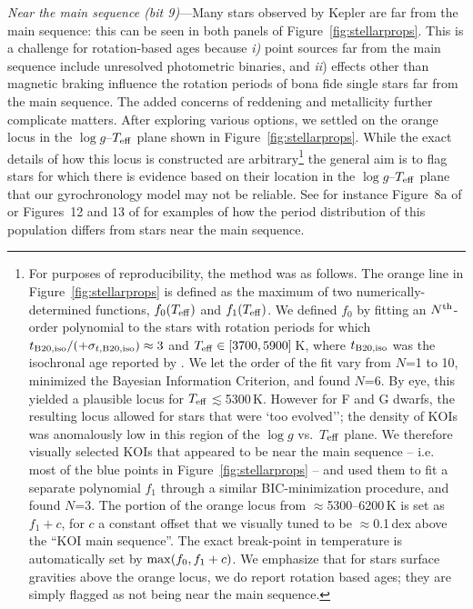 \documentclass[11pt,twocolumn,tighten]{aastex63}
\begin{document}
{\it Near the main sequence (bit 9)}---Many stars observed by Kepler
are far from the main sequence: this can be seen in both panels of
Figure~\ref{fig:stellarprops}.  This is a challenge for rotation-based
ages because {\it i)} point sources far from the main sequence include
unresolved photometric binaries, and {\it ii}) effects other than
magnetic braking influence the rotation periods of bona fide single
stars far from the main sequence.  The added concerns of
reddening and metallicity further complicate matters.  After exploring
various options, we settled on the orange locus in the $\log
g$--$T_{\rm eff}$ plane shown in Figure~\ref{fig:stellarprops}.  While
the exact details of how this locus is constructed are arbitrary\footnote{For purposes of reproducibility, 
	the method was as follows.
The orange line in Figure~\ref{fig:stellarprops} is	defined as
the maximum of two numerically-determined functions, $f_0(T_{\rm eff})$ and $f_1(T_{\rm eff})$.
We defined $f_0$ by fitting an
$N^{\rm th}$-order polynomial to the stars with rotation periods for which $t_{\rm
B20,iso}/(+\sigma_{t,{\rm B20,iso}})\approx 3$
and $T_{\rm eff}\in[3700,5900]$\,K, where
$t_{\rm B20,iso}$ was the isochronal age reported by
\citet{Berger_2020a_catalog}.  We let the order of the fit vary from
$N$=1 to 10, minimized the Bayesian Information Criterion,
and found $N$=6.  
By eye, this yielded a plausible locus for $T_{\rm eff}$$\lesssim$5300\,K.
However for F and G dwarfs, the resulting locus
allowed for stars that were `too evolved''; the density of KOIs 
was anomalously low in this region of the $\log g$ vs.\ $T$$_{\rm eff}$ plane.
We therefore visually selected KOIs that appeared
to be near the main sequence -- i.e.~ most of the blue
points in Figure~\ref{fig:stellarprops} -- and used them to fit a separate
polynomial $f_1$ through a similar BIC-minimization procedure,
and found $N$=3.
The portion of the orange locus from $\approx$5300--6200\,K
is set as $f_1 + c$, for $c$ a constant offset that we visually tuned to be
$\approx$0.1\,dex above the ``KOI main sequence''.
The exact break-point in temperature is automatically set by ${\rm max}(f_0, f_1+c)$.
We emphasize that for stars
surface gravities above the orange locus, we do report rotation based ages;
they are simply flagged as not being near the main sequence.  }
the general aim is to flag stars for which there is evidence based on
their location in the $\log g$--$T_{\rm eff}$ plane that our
gyrochronology model may not be reliable.  
See for instance Figure~8a of \citet{2022AJ....164..137K} or
Figures~12 and 13 of \citet{2023ApJS..268....4F} for examples of how
the period distribution of this population differs from stars near the
main sequence.
\end{document}
